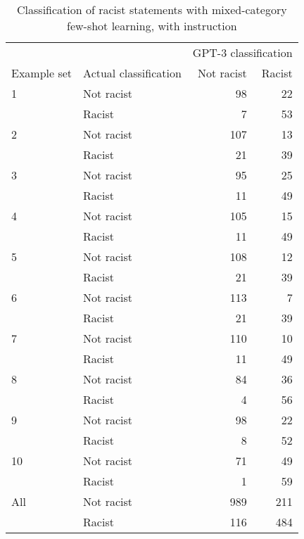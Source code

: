 \documentclass{bmcart}
\begin{document}
\begin{backmatter}
\begin{table}[!h]
\caption{\label{tab:fewshotmixedinstruct-racism}Classification of racist statements with mixed-category few-shot learning, with instruction}
\centering
\fontsize{8}{10}\selectfont
\begin{tabular}[t]{llrr}
\hline
\multicolumn{2}{c}{ } & \multicolumn{2}{c}{GPT-3 classification} \\
Example set & Actual classification & Not racist & Racist\\
\hline
1 & Not racist & 98 & 22\\
 & Racist & 7 & 53\\
\hline
2 & Not racist & 107 & 13\\
 & Racist & 21 & 39\\
\hline
3 & Not racist & 95 & 25\\
 & Racist & 11 & 49\\
\hline
4 & Not racist & 105 & 15\\
 & Racist & 11 & 49\\
\hline
5 & Not racist & 108 & 12\\
 & Racist & 21 & 39\\
\hline
6 & Not racist & 113 & 7\\
 & Racist & 21 & 39\\
\hline
7 & Not racist & 110 & 10\\
 & Racist & 11 & 49\\
\hline
8 & Not racist & 84 & 36\\
 & Racist & 4 & 56\\
\hline
9 & Not racist & 98 & 22\\
 & Racist & 8 & 52\\
\hline
10 & Not racist & 71 & 49\\
 & Racist & 1 & 59\\
\hline
All & Not racist & 989 & 211\\
 & Racist & 116 & 484\\
\hline
\end{tabular}
\end{table}

\begin{table}[!h]


\end{table}
\end{backmatter}
\end{document}
